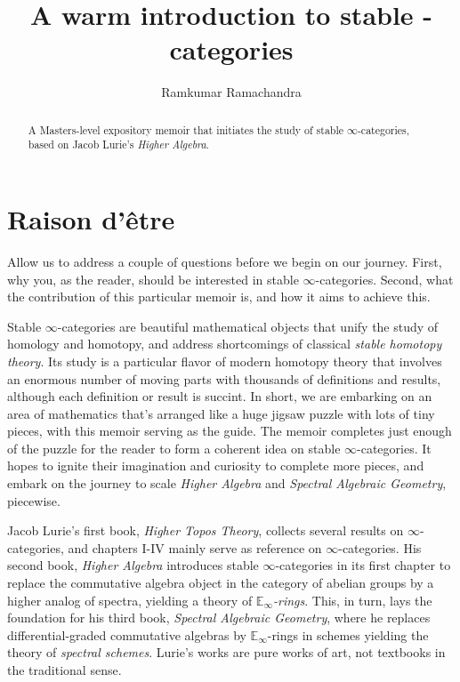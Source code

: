 \documentclass[10pt]{amsart}
\title{A warm introduction to stable \8-categories}
\author{Ramkumar Ramachandra}
\newcommand{\8}{\ensuremath{\infty}}
\newcommand{\0}{\ensuremath{\overset{\rightarrow}{0}}}
\newcommand{\1}{\ensuremath{\mathbf{1}}}
\theoremstyle{definition}
\numberwithin{definition}{subsection}
\numberwithin{definition}{section}
\begin{document}
\begin{abstract}
  A Masters-level expository memoir that initiates the study of stable \8-categories, based on Jacob Lurie's \textit{Higher Algebra}.
\end{abstract}
\maketitle
\tableofcontents
\newpage

{\renewcommand{\addtocontents}[2]{}
  \section*{Raison d'être}
  Allow us to address a couple of questions before we begin on our journey. First, why you, as the reader, should be interested in stable \8-categories. Second, what the contribution of this particular memoir is, and how it aims to achieve this.

  Stable \8-categories are beautiful mathematical objects that unify the study of homology and homotopy, and address shortcomings of classical \emph{stable homotopy theory}. Its study is a particular flavor of modern homotopy theory that involves an enormous number of moving parts with thousands of definitions and results, although each definition or result is succint. In short, we are embarking on an area of mathematics that's arranged like a huge jigsaw puzzle with lots of tiny pieces, with this memoir serving as the guide. The memoir completes just enough of the puzzle for the reader to form a coherent idea on stable \8-categories. It hopes to ignite their imagination and curiosity to complete more pieces, and embark on the journey to scale \emph{Higher Algebra} and \emph{Spectral Algebraic Geometry}, piecewise.

  Jacob Lurie's first book, \emph{Higher Topos Theory}, collects several results on \8-categories, and chapters I-IV mainly serve as reference on \8-categories. His second book, \emph{Higher Algebra} introduces stable \8-categories in its first chapter to replace the commutative algebra object in the category of abelian groups by a higher analog of spectra, yielding a theory of \emph{$\mathbb{E}_\8$-rings}. This, in turn, lays the foundation for his third book, \emph{Spectral Algebraic Geometry}, where he replaces differential-graded commutative algebras by $\mathbb{E}_\8$-rings in schemes yielding the theory of \emph{spectral schemes}. Lurie's works are pure works of art, not textbooks in the traditional sense.

}
\end{document}

